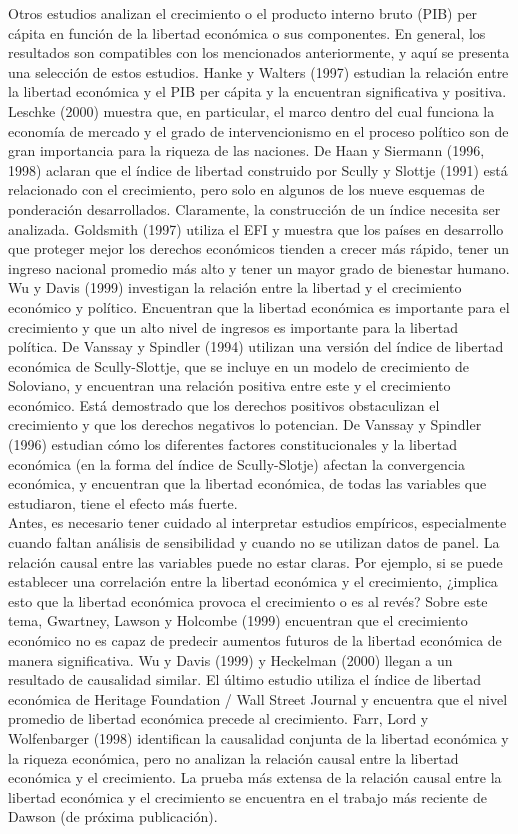     Otros estudios analizan el crecimiento o el producto interno bruto (PIB) per cápita en función de la libertad económica o sus componentes. En general, los resultados son compatibles con los mencionados anteriormente, y aquí se presenta una selección de estos estudios. Hanke y Walters (1997) estudian la relación entre la libertad económica y el PIB per cápita y la encuentran significativa y positiva. Leschke (2000) muestra que, en particular, el marco dentro del cual funciona la economía de mercado y el grado de intervencionismo en el proceso político son de gran importancia para la riqueza de las naciones. De Haan y Siermann (1996, 1998) aclaran que el índice de libertad construido por Scully y Slottje (1991) está relacionado con el crecimiento, pero solo en algunos de los nueve esquemas de ponderación desarrollados. Claramente, la construcción de un índice necesita ser analizada. Goldsmith (1997) utiliza el EFI y muestra que los países en desarrollo que proteger mejor los derechos económicos tienden a crecer más rápido, tener un ingreso nacional promedio más alto y tener un mayor grado de bienestar humano. Wu y Davis (1999) investigan la relación entre la libertad y el crecimiento económico y político. Encuentran que la libertad económica es importante para el crecimiento y que un alto nivel de ingresos es importante para la libertad política. De Vanssay y Spindler (1994) utilizan una versión del índice de libertad económica de Scully-Slottje, que se incluye en un modelo de crecimiento de Soloviano, y encuentran una relación positiva entre este y el crecimiento económico. Está demostrado que los derechos positivos obstaculizan el crecimiento y que los derechos negativos lo potencian. De Vanssay y Spindler (1996) estudian cómo los diferentes factores constitucionales y la libertad económica (en la forma del índice de Scully-Slotje) afectan la convergencia económica, y encuentran que la libertad económica, de todas las variables que estudiaron, tiene el efecto más fuerte.\\
    Antes, es necesario tener cuidado al interpretar estudios empíricos, especialmente cuando faltan análisis de sensibilidad y cuando no se utilizan datos de panel. La relación causal entre las variables puede no estar claras. Por ejemplo, si se puede establecer una correlación entre la libertad económica y el crecimiento, ¿implica esto que la libertad económica provoca el crecimiento o es al revés? Sobre este tema, Gwartney, Lawson y Holcombe (1999) encuentran que el crecimiento económico no es capaz de predecir aumentos futuros de la libertad económica de manera significativa. Wu y Davis (1999) y Heckelman (2000) llegan a un resultado de causalidad similar. El último estudio utiliza el índice de libertad económica de Heritage Foundation / Wall Street Journal y encuentra que el nivel promedio de libertad económica precede al crecimiento. Farr, Lord y Wolfenbarger (1998) identifican la causalidad conjunta de la libertad económica y la riqueza económica, pero no analizan la relación causal entre la libertad económica y el crecimiento. La prueba más extensa de la relación causal entre la libertad económica y el crecimiento se encuentra en el trabajo más reciente de Dawson (de próxima publicación).\\
